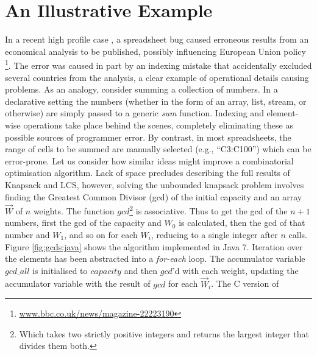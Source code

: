 \section{An Illustrative Example}
In a recent high profile case \cite{Herndon13}, a spreadsheet bug caused
erroneous results from an economical analysis to be published, possibly
influencing European Union policy%
\footnote{\url{www.bbc.co.uk/news/magazine-22223190}}.
The error was caused in part by an indexing mistake that accidentally excluded
several countries from the analysis, a clear example of operational details causing
problems.
As an analogy, consider summing a collection of numbers. In a declarative
setting
the numbers (whether in the form of an array, list, stream, or
otherwise) are simply passed to a generic \emph{sum} function. Indexing and
element-wise operations take place behind the scenes, completely eliminating
these as possible sources of programmer error. By contrast, in most spreadsheets, the range of cells to
be summed are manually selected (e.g., ``C3:C100'') which can be error-prone.
Let us consider how similar ideas might improve a combinatorial
optimisation algorithm. 
Lack of space precludes describing the full results of Knapsack and LCS, however, solving the unbounded knapsack problem involves finding the Greatest Common Divisor (gcd) of the initial capacity and an array $\vec{W}$ of $n$
weights. The function $gcd$\footnote{Which takes two strictly positive integers and returns the largest integer that divides them both.}
is associative. Thus to get the gcd of the $n+1$ numbers, first the gcd of the capacity and $W_0$ is calculated, then the gcd of that number and $W_1$, and so on for each $W_i$,
reducing to a single integer after $n$ calls. Figure \ref{fig:gcds:java} shows
the algorithm implemented in Java 7. Iteration over the elements has been
abstracted into a \emph{for-each} loop. The accumulator variable $gcd\_all$ is initialised to $capacity$ and then $gcd$'d with each weight, updating the accumulator
variable with the result of $gcd$ for each $\vec{W}_i$. The C version of
